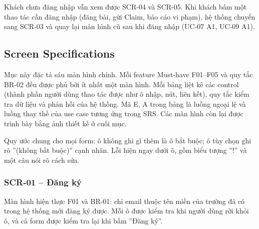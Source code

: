 Khách chưa đăng nhập vẫn xem được SCR-04 và SCR-05. Khi khách bấm một thao tác cần đăng nhập (đăng bài, gửi Claim, báo cáo vi phạm), hệ thống chuyển sang SCR-03 và quay lại màn hình cũ sau khi đăng nhập (UC-07 A1, UC-09 A1).

\subsection{Screen Specifications}

Mục này đặc tả sáu màn hình chính. Mỗi feature Must-have F01--F05 và quy tắc BR-02 đều được phủ bởi ít nhất một màn hình. Mỗi bảng liệt kê các control (thành phần người dùng thao tác được như ô nhập, nút, liên kết), quy tắc kiểm tra dữ liệu và phản hồi của hệ thống. Mã E, A trong bảng là luồng ngoại lệ và luồng thay thế của use case tương ứng trong SRS. Các màn hình còn lại được trình bày bằng ảnh thiết kế ở cuối mục.

Quy ước chung cho mọi form: ô không ghi gì thêm là ô bắt buộc; ô tùy chọn ghi rõ ''(không bắt buộc)'' cạnh nhãn. Lỗi hiện ngay dưới ô, gồm biểu tượng ''!'' và một câu nói rõ cách sửa.

\subsubsection{SCR-01 -- Đăng ký}

Màn hình hiện thực F01 và BR-01: chỉ email thuộc tên miền của trường đã có trong hệ thống mới đăng ký được. Mỗi ô được kiểm tra khi người dùng rời khỏi ô, và cả form được kiểm tra lại khi bấm ''Đăng ký''.

